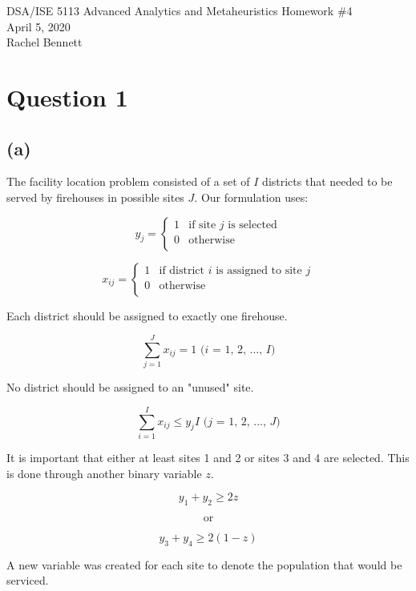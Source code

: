 \documentclass[12pt, letterpaper]{article}
\begin{document}
\begin{center}
\Large DSA/ISE 5113 Advanced Analytics and Metaheuristics
\Large Homework \#4\\
\vspace{3mm}
\normalsize April 5, 2020\\
\vspace{3mm}
\normalsize Rachel Bennett
\end{center}

\section*{Question 1}
\subsection*{(a)}
The facility location problem consisted of a set of $I$ districts that needed to be served by firehouses in possible sites $J$. 
Our formulation uses:

\[
  y_j =
  \begin{cases}
                                   1 & \text{if site $j$ is selected} \\
                                   0 & \text{otherwise} \\
  \end{cases}
\]


\[
  x_{ij} =
  \begin{cases}
                                   1 & \text{if district $i$ is assigned to site $j$} \\
                                   0 & \text{otherwise} \\
  \end{cases}
\]

Each district should be assigned to exactly one firehouse.

$$ \sum_{j=1}^{J} x_{ij} = 1 \text{   ($i$ = 1, 2, ..., $I$)}$$

No district should be assigned to an "unused" site.

$$ \sum_{i=1}^{I} x_{ij} \leq y_{j}I \text{   ($j$ = 1, 2, ..., $J$)}$$

It is important that either at least sites 1 and 2 or sites 3 and 4 are selected. This is done through another binary variable $z$.

$$y_1 + y_2 \geq 2z$$

$$\text{or}$$

$$y_3 + y_4 \geq 2(1-z)$$

A new variable was created for each site to denote the population that would be serviced.
\end{document}

